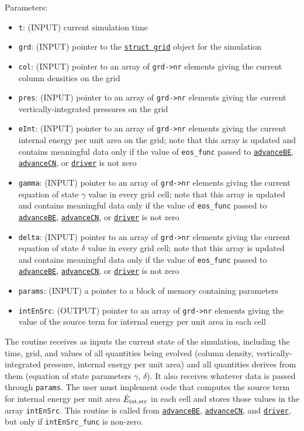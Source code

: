 \documentclass[12pt]{article}
\begin{document}
Parameters:
\begin{itemize}
\item \texttt{t}: (INPUT) current simulation time
\item \texttt{grd}: (INPUT) pointer to the \hyperref[sssec:datastructures]{\texttt{struct grid}} object for the simulation
\item \texttt{col}: (INPUT) pointer to an array of \texttt{grd->nr} elements giving the current column densities on the grid
\item \texttt{pres}: (INPUT) pointer to an array of \texttt{grd->nr} elements giving the current vertically-integrated pressures on the grid
\item \texttt{eInt}: (INPUT) pointer to an array of \texttt{grd->nr} elements giving the current internal energy per unit area on the grid; note that this array is updated and contains meaningful data only if the value of \verb=eos_func= passed to \hyperref[sssec:advanceBE]{\texttt{advanceBE}}, \hyperref[sssec:advanceCN]{\texttt{advanceCN}}, or \hyperref[sssec:driver]{\texttt{driver}} is not zero
\item \texttt{gamma}: (INPUT) pointer to an array of \texttt{grd->nr} elements giving the current equation of state $\gamma$ value in every grid cell; note that this array is updated and contains meaningful data only if the value of \verb=eos_func= passed to \hyperref[sssec:advanceBE]{\texttt{advanceBE}}, \hyperref[sssec:advanceCN]{\texttt{advanceCN}}, or \hyperref[sssec:driver]{\texttt{driver}} is not zero
\item \texttt{delta}: (INPUT) pointer to an array of \texttt{grd->nr} elements giving the current equation of state $\delta$ value in every grid cell; note that this array is updated and contains meaningful data only if the value of \verb=eos_func= passed to \hyperref[sssec:advanceBE]{\texttt{advanceBE}}, \hyperref[sssec:advanceCN]{\texttt{advanceCN}}, or \hyperref[sssec:driver]{\texttt{driver}} is not zero
\item \texttt{params}: (INPUT) a pointer to a block of memory containing parameters
\item \texttt{intEnSrc}: (OUTPUT) pointer to an array of \texttt{grd->nr} elements giving the value of the source term for internal energy per unit area in each cell
\end{itemize}

The routine receives as inputs the current state of the simulation, including the time, grid, and values of all quantities being evolved (column density, vertically-integrated pressure, internal energy per unit area) and all quantities derives from them (equation of state parameters $\gamma$, $\delta$). It also receives whatever data is passed through \verb=params=. The user must implement code that computes the source term for internal energy per unit area $\dot{E}_{\rm int,src}$ in each cell and stores those values in the array \verb=intEnSrc=. This routine is called from \hyperref[sssec:advanceBE]{\texttt{advanceBE}}, \hyperref[sssec:advanceCN]{\texttt{advanceCN}}, and \hyperref[sssec:driver]{\texttt{driver}}, but only if \verb=intEnSrc_func= is non-zero.
\end{document}
